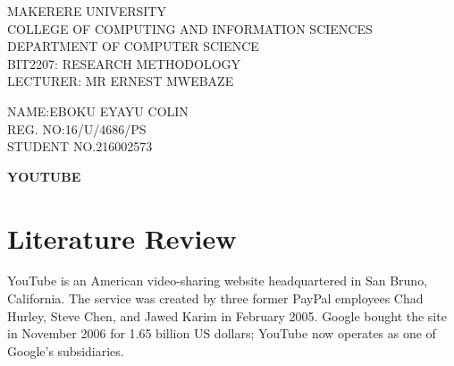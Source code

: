\documentclass{article}                    %
\begin{document}
\begin{titlepage} %

	\centering %
	
	\scshape %
	
	\vspace*{\baselineskip} %
	
	
		
	\vspace{0.80\baselineskip} %
	
	{\LARGE MAKERERE UNIVERSITY\\ COLLEGE OF COMPUTING AND INFORMATION SCIENCES\\ DEPARTMENT OF COMPUTER SCIENCE\\BIT2207: RESEARCH METHODOLOGY\\LECTURER: MR ERNEST MWEBAZE\\} %
	
	\vspace{8.00\baselineskip} %
	

	
	
	\vspace{0.5\baselineskip} %
	
	{\scshape\Large NAME:EBOKU EYAYU COLIN\\REG. NO:16/U/4686/PS\\STUDENT NO.216002573 \\} %
	
	\vspace{0.5\baselineskip} %
\end{titlepage}
\newpage
{\textbf{YOUTUBE}}
\section{Literature Review}
YouTube is an American video-sharing website headquartered in San Bruno, California. The service was created by three former PayPal employees Chad Hurley, Steve Chen, and Jawed Karim in February 2005. Google bought the site in November 2006 for 1.65 billion US dollars; YouTube now operates as one of Google's subsidiaries.
\end{document}
